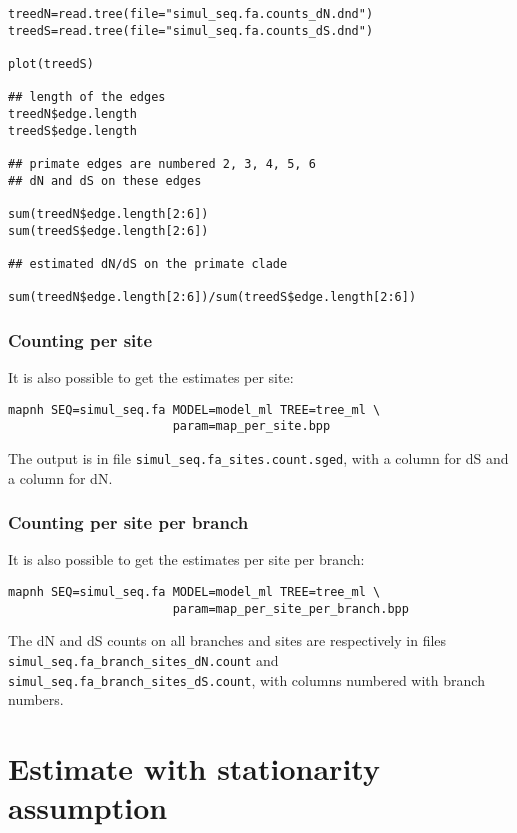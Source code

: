 \documentclass[11pt, a4paper]{article}
\begin{document}
{\begin{verbatim}
treedN=read.tree(file="simul_seq.fa.counts_dN.dnd")  
treedS=read.tree(file="simul_seq.fa.counts_dS.dnd")  

plot(treedS)

## length of the edges 
treedN$edge.length
treedS$edge.length

## primate edges are numbered 2, 3, 4, 5, 6
## dN and dS on these edges

sum(treedN$edge.length[2:6])
sum(treedS$edge.length[2:6])

## estimated dN/dS on the primate clade

sum(treedN$edge.length[2:6])/sum(treedS$edge.length[2:6])

\end{verbatim}


\subsubsection*{Counting per site}

It is also possible to get the estimates per site:

\begin{verbatim}
mapnh SEQ=simul_seq.fa MODEL=model_ml TREE=tree_ml \
                       param=map_per_site.bpp
\end{verbatim}


The output is in file \verb|simul_seq.fa_sites.count.sged|, with a column
for dS and a column for dN.

\subsubsection*{Counting per site per branch}

It is also possible to get the estimates per site per branch:

\begin{verbatim}
mapnh SEQ=simul_seq.fa MODEL=model_ml TREE=tree_ml \
                       param=map_per_site_per_branch.bpp
\end{verbatim}

The dN and dS counts on all branches and sites are respectively in
files \verb|simul_seq.fa_branch_sites_dN.count| and\\
\verb|simul_seq.fa_branch_sites_dS.count|, with columns numbered
with branch numbers.


\section*{Estimate with stationarity assumption}

}
\end{document}
